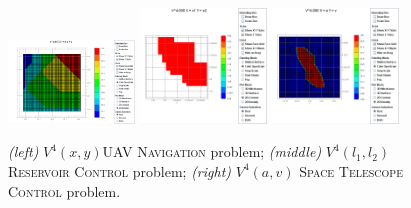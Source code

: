 ﻿%
\begin{figure}[tbp!]
\centering
\includegraphics[width=0.30\textwidth]{Figures/uav.png}
\includegraphics[width=0.30\textwidth]{Figures/reservoir.png}
\includegraphics[width=0.30\textwidth]{Figures/telescope.png}
\vspace{-2mm}
\caption{\footnotesize
{\it (left)}  $V^4(x,y)$\textsc{UAV Navigation} problem;
{\it (middle)} $V^4(l_1,l_2)$ \textsc{Reservoir Control} problem;
{\it (right)} $V^4(a,v)$ \textsc{Space Telescope Control} problem.
}
\label{fig:Value}
\vspace{-5mm}
\end{figure}


